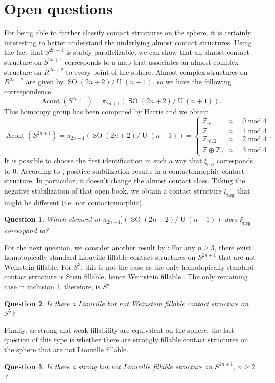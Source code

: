 \documentclass{amsart}
\newtheorem{question}{Question}
\begin{document}
\section*{Open questions}
For being able to further classify contact structures on the sphere, it is certainly interesting to better understand the underlying almost contact structures.
Using the fact that $S^{2n+1}$ is stably parallelizable, we can show that an almost contact structure on $S^{2n+1}$ corresponds to a map that associates an almost complex structure on $R^{2n+2}$
to every point of the sphere.
Almost complex structures on $R^{2n+2}$ are given by $\operatorname{SO}(2n + 2)/\operatorname{U}(n + 1)$, so we have the following correspondence
\[
    \operatorname{Acont}\left(S^{2n+1}\right) = \pi_{2n+1}(\operatorname{SO}(2n + 2)/\operatorname{U}(n + 1)).
\]
This homotopy group has been computed by Harris \cite{Harris63} and we obtain
\[
    \operatorname{Acont}\left(S^{2n+1}\right) = \pi_{2n+1}(\operatorname{SO}(2n + 2)/\operatorname{U}(n + 1)) = \begin{cases}
        \mathbb Z_{n!} &n = 0 \operatorname{mod} 4\\
        \mathbb Z &n = 1 \operatorname{mod} 4\\
        \mathbb Z_{n!/2} &n = 2 \operatorname{mod} 4\\
        \mathbb Z \oplus \mathbb Z_2 &n = 3 \operatorname{mod} 4
    \end{cases}.
\]
It is possible to choose the first identification in such a way that $\xi_{\mathrm{std}}$ corresponds to $0$.
According to \cite{Giroux02}, positive stabilization results in a contactomorphic
contact structure. In particular, it doesn't change the almost contact class.
Taking the negative stabilization of that open book, we obtain a contact structure $\xi_\mathrm{neg}$ that might be different (i.e. not contactomorphic).
\begin{question}
     Which element of $\pi_{2n+1}](\operatorname{SO}(2n + 2)/\operatorname{U}(n + 1))$ does $\xi_\mathrm{neg}$ correspond to?
\end{question}

For the next question, we consider another result by \cite{BGMZ22}: For any $n \geq 3$, there exist homotopically standard Liouville fillable contact structures on $S^{2n+1}$ that are not Weinstein fillable.
For $S^3$, this is not the case as the only homotopically standard contact structure is
Stein fillable, hence Weinstein fillable \cite{CE12}.
The only remaining case in inclusion 1, therefore, is $S^5$.
\begin{question}
Is there a Liouville but not Weinstein fillable contact structure on $S^5$? 
\end{question}
Finally, as strong and weak fillability are equivalent on the sphere,
the last question of this type is whether there are strongly fillable contact structures on the sphere that are not Liouville fillable.
\begin{question}
    Is there a strong but not Liouville fillable structure on $S^{2n+1}$, $n \ge 2$?
\end{question}
\newpage
\nocite{*}


\end{document}
